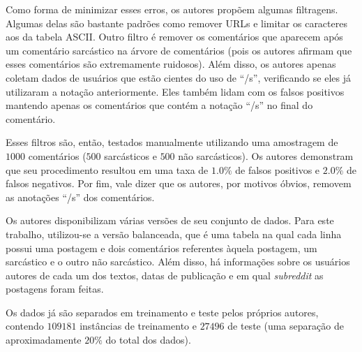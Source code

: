 Como forma de minimizar esses erros, os autores propõem algumas filtragens.
Algumas delas são bastante padrões como remover URLs e limitar os caracteres aos
da tabela ASCII. Outro filtro é remover os comentários que aparecem após um
comentário sarcástico na árvore de comentários (pois os autores afirmam que
esses comentários são extremamente ruidosos). Além disso, os autores apenas
coletam dados de usuários que estão cientes do uso de ``/s'', verificando se
eles já utilizaram a notação anteriormente. Eles também lidam com os falsos
positivos mantendo apenas os comentários que contém a notação ``/s'' no final do
comentário.

Esses filtros são, então, testados manualmente utilizando uma amostragem de
$1000$ comentários ($500$ sarcásticos e $500$ não sarcásticos). Os autores
demonstram que seu procedimento resultou em uma taxa de $1.0\%$ de falsos
positivos e $2.0\%$ de falsos negativos. Por fim, vale dizer que os autores, por
motivos óbvios, removem as anotações ``/s'' dos comentários.

Os autores disponibilizam várias versões de seu conjunto de dados. Para este
trabalho, utilizou-se a versão balanceada, que é uma tabela na qual cada linha
possui uma postagem e dois comentários referentes àquela postagem, um sarcástico
e o outro não sarcástico. Além disso, há informações sobre os usuários autores
de cada um dos textos, datas de publicação e em qual \textit{subreddit} as
postagens foram feitas.

Os dados já são separados em treinamento e teste pelos próprios autores,
contendo $109181$ instâncias de treinamento e $27496$ de teste (uma
separação de aproximadamente $20\%$ do total dos dados).
